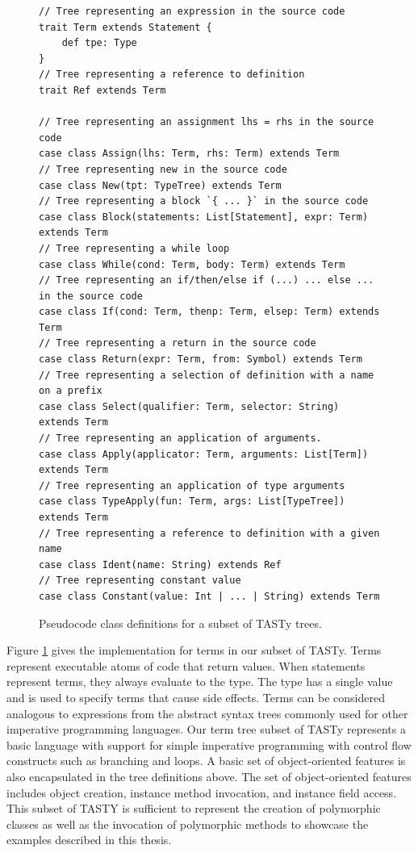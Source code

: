\begin{figure}[!htb]
\begin{verbatim}
// Tree representing an expression in the source code
trait Term extends Statement {
	def tpe: Type
}
// Tree representing a reference to definition      
trait Ref extends Term

// Tree representing an assignment lhs = rhs in the source code
case class Assign(lhs: Term, rhs: Term) extends Term
// Tree representing new in the source code
case class New(tpt: TypeTree) extends Term
// Tree representing a block `{ ... }` in the source code
case class Block(statements: List[Statement], expr: Term) extends Term
// Tree representing a while loop
case class While(cond: Term, body: Term) extends Term
// Tree representing an if/then/else if (...) ... else ... in the source code
case class If(cond: Term, thenp: Term, elsep: Term) extends Term
// Tree representing a return in the source code
case class Return(expr: Term, from: Symbol) extends Term
// Tree representing a selection of definition with a name on a prefix
case class Select(qualifier: Term, selector: String) extends Term 
// Tree representing an application of arguments.
case class Apply(applicator: Term, arguments: List[Term]) extends Term
// Tree representing an application of type arguments
case class TypeApply(fun: Term, args: List[TypeTree]) extends Term
// Tree representing a reference to definition with a given name
case class Ident(name: String) extends Ref 
// Tree representing constant value
case class Constant(value: Int | ... | String) extends Term 
\end{verbatim}
\caption{Pseudocode class definitions for a subset of TASTy trees.}
\label{tasty:terms}
\end{figure}

Figure \ref{tasty:terms} gives the implementation for terms in our subset of TASTy.
Terms represent executable atoms of code that return values.
When statements represent terms, they always evaluate to the  type.
The  type has a single value and is used to specify terms that cause side effects.
Terms can be considered analogous to expressions from the abstract syntax trees commonly used for other imperative programming languages.
Our term tree subset of TASTy represents a basic language with support for simple imperative programming with control flow constructs such as branching and loops.
A basic set of object-oriented features is also encapsulated in the tree definitions above.
The set of object-oriented features includes object creation, instance method invocation, and instance field access.
This subset of TASTY is sufficient to represent the creation of polymorphic classes as well as the invocation of polymorphic methods to showcase the examples described in this thesis.

